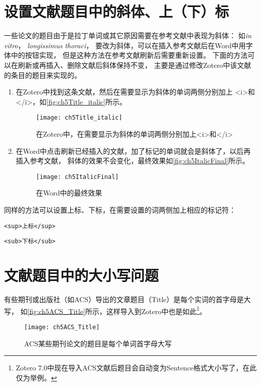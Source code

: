 \documentclass[theorem=false,mathfont=none,openany,sub3section]{easybook}
\begin{document}
{\section{设置文献题目中的斜体、上（下）标}\label{sec:italic}
一些论文的题目由于是拉丁单词或其它原因需要在参考文献中表现为斜体：
如\textit{in vitro}， \textit{longissimus thoraci}，
要改为斜体，可以在插入参考文献后在Word中用字体中的按钮实现，
但是这种方法在参考文献刷新后需要重新设置。
下面的方法可以在刷新或再插入、删除文献后斜体保持不变，
主要是通过修改Zotero中该文献的条目的题目来实现的。
\begin{enumerate}
	\item 在Zotero中找到这条文献，然后在需要显示为斜体的单词两侧分别加上
	<i>和</i>，如\autoref{fig:ch5Title_italic}所示。
	\begin{figure}[htbp]
		\centering
		\texttt{[image: ch5Title\_italic]}
		\caption{在Zotero中，在需要显示为斜体的单词两侧分别加上<i>和</i>}
		\label{fig:ch5Title_italic}
	\end{figure}
	\item 在Word中点击刷新已经插入的文献，加了标记的单词就会是斜体了，以后再插入参考文献，
	斜体的效果不会变化，最终效果如\autoref{fig:ch5ItalicFinal}所示。

	\begin{figure}[htbp]
		\centering
		\texttt{[image: ch5ItalicFinal]}
		\caption{在Word中的最终效果}
		\label{fig:ch5ItalicFinal}
	\end{figure}
\end{enumerate}
\vspace{1em}

同样的方法可以设置上标、下标，在需要设置的词两侧加上相应的标记符：

\verb|<sup>上标</sup> |	

\verb|<sub>下标</sub> |

\section{文献题目中的大小写问题}\label{sec:case}
有些期刊或出版社（如ACS）导出的文章题目（Title）是每个实词的首字母是大写，
如\autoref{fig:ch5ACS_Title}所示，这样导入到Zotero中也是如此\footnote{Zotero 7.0中现在导入ACS文献后题目会自动变为Sentence格式大小写了，在此仅为举例。}。
\begin{figure}[htbp]
	\centering
	\texttt{[image: ch5ACS\_Title]}
	\caption{ACS某些期刊论文的题目是每个单词首字母大写}
	\label{fig:ch5ACS_Title}
\end{figure}	

}
\end{document}

